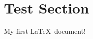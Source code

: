 \documentclass{article}
\begin{document}
\section{Test Section}
\lipsum[1]

My first \LaTeX~document!
\end{document}
